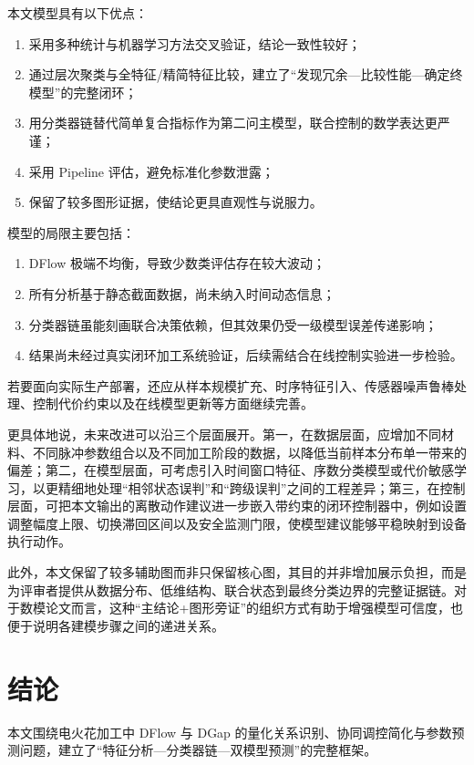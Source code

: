 \documentclass[UTF8,a4paper,12pt]{ctexart}
\begin{document}
本文模型具有以下优点：
\begin{enumerate}[label=(\arabic*),leftmargin=2em]
\item 采用多种统计与机器学习方法交叉验证，结论一致性较好；
\item 通过层次聚类与全特征/精简特征比较，建立了“发现冗余—比较性能—确定终模型”的完整闭环；
\item 用分类器链替代简单复合指标作为第二问主模型，联合控制的数学表达更严谨；
\item 采用 Pipeline 评估，避免标准化参数泄露；
\item 保留了较多图形证据，使结论更具直观性与说服力。
\end{enumerate}

模型的局限主要包括：
\begin{enumerate}[label=(\arabic*),leftmargin=2em]
\item DFlow 极端不均衡，导致少数类评估存在较大波动；
\item 所有分析基于静态截面数据，尚未纳入时间动态信息；
\item 分类器链虽能刻画联合决策依赖，但其效果仍受一级模型误差传递影响；
\item 结果尚未经过真实闭环加工系统验证，后续需结合在线控制实验进一步检验。
\end{enumerate}

若要面向实际生产部署，还应从样本规模扩充、时序特征引入、传感器噪声鲁棒处理、控制代价约束以及在线模型更新等方面继续完善。

更具体地说，未来改进可以沿三个层面展开。第一，在数据层面，应增加不同材料、不同脉冲参数组合以及不同加工阶段的数据，以降低当前样本分布单一带来的偏差；第二，在模型层面，可考虑引入时间窗口特征、序数分类模型或代价敏感学习，以更精细地处理“相邻状态误判”和“跨级误判”之间的工程差异；第三，在控制层面，可把本文输出的离散动作建议进一步嵌入带约束的闭环控制器中，例如设置调整幅度上限、切换滞回区间以及安全监测门限，使模型建议能够平稳映射到设备执行动作。

此外，本文保留了较多辅助图而非只保留核心图，其目的并非增加展示负担，而是为评审者提供从数据分布、低维结构、联合状态到最终分类边界的完整证据链。对于数模论文而言，这种“主结论+图形旁证”的组织方式有助于增强模型可信度，也便于说明各建模步骤之间的递进关系。

\section{结论}

本文围绕电火花加工中 DFlow 与 DGap 的量化关系识别、协同调控简化与参数预测问题，建立了“特征分析—分类器链—双模型预测”的完整框架。
\end{document}
